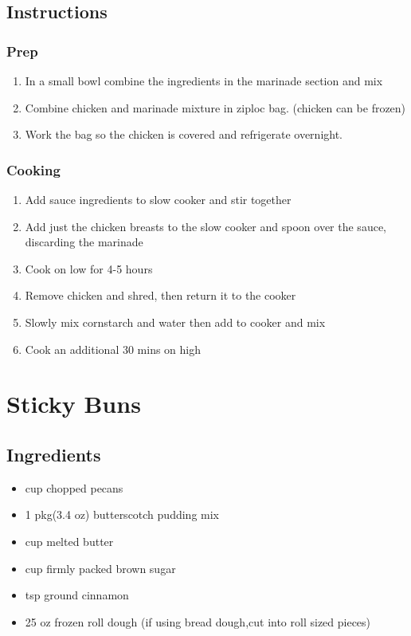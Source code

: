 \documentclass{article}
\begin{document}
\subsection{Instructions}
\subsubsection{Prep}
\begin{enumerate}
\item In a small bowl combine the ingredients in the marinade section and mix
\item Combine chicken and marinade mixture in ziploc bag. (chicken can be frozen)
\item Work the bag so the chicken is covered and refrigerate overnight.
\end{enumerate}
\subsubsection{Cooking}
\begin{enumerate}
\item Add sauce ingredients to slow cooker and stir together
\item Add just the chicken breasts to the slow cooker and spoon over the sauce, discarding the marinade
\item Cook on low for 4-5 hours
\item Remove chicken and shred, then return it to the cooker
\item Slowly mix cornstarch and water then add to cooker and mix
\item Cook an additional 30 mins on high
\end{enumerate}


\section{Sticky Buns}
\subsection{Ingredients}
\begin{itemize}
\item {} cup chopped pecans
\item 1 pkg(3.4 oz) butterscotch pudding mix
\item {} cup melted butter
\item {} cup firmly packed brown sugar
\item {} tsp ground cinnamon
\item 25 oz frozen roll dough (if using bread dough,cut into roll sized pieces)
\end{itemize}
\end{document}
